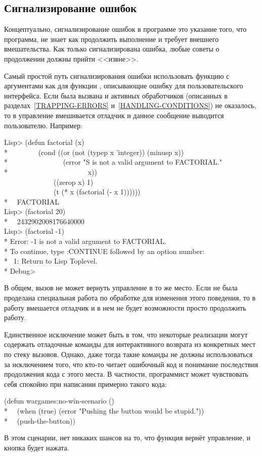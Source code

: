 \subsection{Сигнализирование ошибок}

Концептуально, сигнализирование ошибок в программе это указание того, что
программа, не знает как продолжить выполнение и требует внешнего
вмешательства. Как только сигнализирована ошибка, любые советы о
продолжении должны прийти <<извне>>.

Самый простой путь сигнализирования ошибки использовать функцию  с
аргументами как для функции , описывающие ошибку для
пользовательского интерфейса. Если была вызвана  и активных
обработчиков (описанных в разделах~\ref{TRAPPING-ERRORS}
и~\ref{HANDLING-CONDITIONS}) не оказалось, то в управление вмешивается отладчик
и данное сообщение выводится пользователю. Например:
\begin{lisp}
Lisp> (defun factorial (x) \\*
~~~~~~~~(cond ((or (not (typep x 'integer)) (minusp x)) \\*
~~~~~~~~~~~~~~~(error "{\Xtilde}S is not a valid argument to FACTORIAL." \\*
~~~~~~~~~~~~~~~~~~~~~~x)) \\
~~~~~~~~~~~~~~((zerop x) 1) \\
~~~~~~~~~~~~~~(t (* x (factorial (- x 1)))))) \\*
~\EV\ FACTORIAL \\
Lisp> (factorial 20) \\*
~\EV\ 2432902008176640000 \\
Lisp> (factorial -1) \\*
Error: -1 is not a valid argument to FACTORIAL. \\*
To continue, type :CONTINUE followed by an option number: \\*
~1: Return to Lisp Toplevel. \\*
Debug> 
\end{lisp}
В общем, вызов  не может вернуть управление в то же место. Если не
была проделана специальная работа по обработке для изменения этого поведения, то
в работу вмешается отладчик и в нем не будет возможности просто продолжить работу.

Единственное исключение может быть в том, что некоторые реализации могут
содержать отладочные команды для интерактивного возврата из конкретных мест по
стеку вызовов. Однако, даже тогда такие команды не должны использоваться за
исключением того, что кто-то читает ошибочный код и понимание последствия
продолжения кода с этого места. В частности, программист может чувствовать себя
спокойно при написании примерно такого кода:
\begin{lisp}
(defun wargames:no-win-scenario () \\*
~~(when (true) (error "Pushing the button would be stupid.")) \\*
~~(push-the-button))
\end{lisp}
В этом сценарии, нет никаких шансов на то, что функция  вернёт
управление, и кнопка будет нажата.

